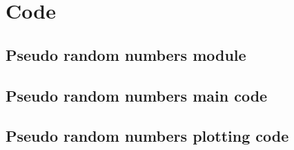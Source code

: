 \documentclass[twocolumn]{myarticle}
\begin{document}
\onecolumn

\section{Code}
\label{sec:code}

\subsection{Pseudo random numbers module}
\label{subsec:pseudo_random_numbers_module}


\vspace{10pt}

\subsection{Pseudo random numbers main code}
\label{subsec:pseudo_random_numbers_main_code}


\vspace{10pt}

\subsection{Pseudo random numbers plotting code}
\label{subsec:pseudo_random_numbers_plotting_code}


\vspace{10pt}
\end{document}
